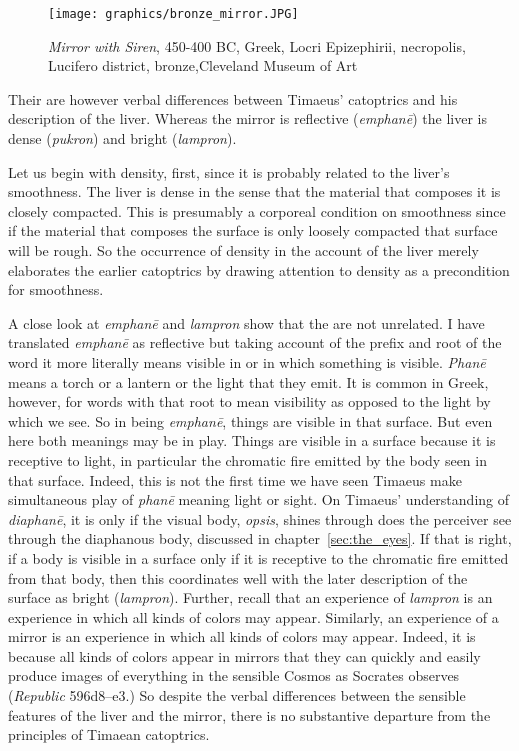 \begin{figure}[htbp]
     \centering
         \texttt{[image: graphics/bronze\_mirror.JPG]}
     \caption{\emph{Mirror with Siren}, 450-400 BC, Greek, Locri Epizephirii, necropolis, Lucifero district, bronze,Cleveland Museum of Art}
     \label{bronze_mirror}
\end{figure}

Their are however verbal differences between Timaeus' catoptrics and his description of the liver. Whereas the mirror is reflective (\emph{emphanē}) the liver is dense (\emph{pukron}) and bright (\emph{lampron}). 

Let us begin with density, first, since it is probably related to the liver's smoothness. The liver is dense in the sense that the material that composes it is closely compacted. This is presumably a corporeal condition on smoothness since if the material that composes the surface is only loosely compacted that surface will be rough. So the occurrence of density in the account of the liver merely elaborates the earlier catoptrics by drawing attention to density as a precondition for smoothness. 

A close look at \emph{emphanē} and \emph{lampron} show that the are not unrelated. I have translated \emph{emphanē} as reflective but taking account of the prefix and root of the word it more literally means visible in or in which something is visible. \emph{Phanē} means a torch or a lantern or the light that they emit. It is common in Greek, however, for words with that root to mean visibility as opposed to the light by which we see. So in being \emph{emphanē}, things are visible in that surface. But even here both meanings may be in play. Things are visible in a surface because it is receptive to light, in particular the chromatic fire emitted by the body seen in that surface. Indeed, this is not the first time we have seen Timaeus make simultaneous play of \emph{phanē} meaning light or sight. On Timaeus' understanding of \emph{diaphanē}, it is only if the visual body, \emph{opsis}, shines through does the perceiver see through the diaphanous body, discussed in chapter~\ref{sec:the_eyes}. If that is right, if a body is visible in a surface only if it is receptive to the chromatic fire emitted from that body, then this coordinates well with the later description of the surface as bright (\emph{lampron}). Further, recall that an experience of \emph{lampron} is an experience in which all kinds of colors may appear. Similarly, an experience of a mirror is an experience in which all kinds of colors may appear. Indeed, it is because all kinds of colors appear in mirrors that they can quickly and easily produce images of everything in the sensible Cosmos as Socrates observes (\emph{Republic} 596d8--e3.) So despite the verbal differences between the sensible features of the liver and the mirror, there is no substantive departure from the principles of Timaean catoptrics.

